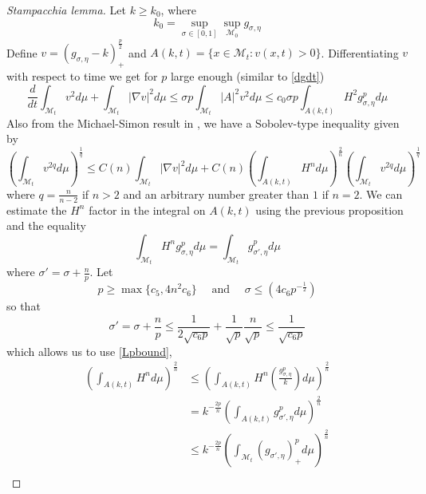     \begin{proof}
        [Stampacchia lemma]

         Let $ k \ge k_{0} $, where $$ k_{0} = \sup_{\sigma \in [0,1]} \sup_{\mathcal{M}_{0}} g_{\sigma, \eta} $$
        Define $ v = (g_{\sigma,\eta} - k)_{+}^{\frac{p}{2}} $ and $ A(k,t) = \{x \in \mathcal{M}_{t} : v(x,t)>0\} $. Differentiating $ v $ with respect to time we get for $ p $ large enough (similar to \cref{dgdt})
        \begin{equation}
            \frac{d}{dt} \int_{\mathcal{M}_{t}}v^{2} d \mu + \int_{\mathcal{M}_{t}} |\nabla v|^{2} d \mu \le \sigma p \int_{\mathcal{M}_{t}} |A|^{2}v^{2} d \mu \le c_{0} \sigma p \int_{A(k,t)}H^{2}g_{\sigma, \eta}^{p} d \mu \label{vestimate}
        \end{equation}
        Also from the Michael-Simon result in \cite{https://doi.org/10.1002/cpa.3160260305}, we have a Sobolev-type inequality given by 
        \begin{equation}
            \left( \int_{\mathcal{M}_{t}}v^{2q} d \mu \right)^{\frac{1}{q}} \le C(n) \int_{\mathcal{M}_{t}} |\nabla v|^{2} d \mu +C(n)\left( \int_{A(k,t)}H^{n}d \mu \right)^{\frac{2}{n}}\left( \int_{\mathcal{M}_{t}}v^{2q} d \mu \right)^{\frac{1}{q}} \label{MS}
        \end{equation}
        where $ q = \frac{n}{n-2}$ if $ n >2 $ and an arbitrary number greater than $ 1 $ if $ n=2 $. We can estimate the $ H^{n} $ factor in the integral on $ A(k,t) $ using the previous proposition and the equality %
        \[ \int_{\mathcal{M}_{t}} H^{n} g_{\sigma, \eta}^{p}d \mu = \int_{\mathcal{M}_{t}}g_{\sigma', \eta}^{p} d \mu \]
        where $ \sigma' = \sigma + \frac{n}{p} $. Let 
        \[ p \ge \max\{c_{5},4n^{2}c_{6}\} \quad \text{ and } \quad \sigma \le (4c_{6}p^{-\frac{1}{2}}) \]
        so that 
        \[ \sigma' = \sigma + \frac{n}{p} \le \frac{1}{2\sqrt{c_{6}p}} + \frac{1}{\sqrt{p}} \frac{n}{\sqrt{p}} \le \frac{1}{\sqrt{c_{6}p}} \] 
        which allows us to use \cref{Lpbound}, \begin{align*}
            \left( \int_{A(k,t)} H^{n} d \mu \right)^{\frac{2}{n}} &\le \left( \int_{A(k,t)}H^{n} \left(\frac{g_{\sigma, \eta}^{p}}{k}\right) d \mu \right)^{\frac{2}{n}} \\
            & = k^{-\frac{2p}{n}} \left( \int_{A(k,t)}g_{\sigma',\eta}^{p}d \mu \right)^{\frac{2}{n}} \\
            & \le k^{-\frac{2p}{n}} \left( \int_{\mathcal{M}_{t}} (g_{\sigma',\eta})_{+}^{p} d \mu\right)^{\frac{2}{n}} \\

\end{align*}
\end{proof}
